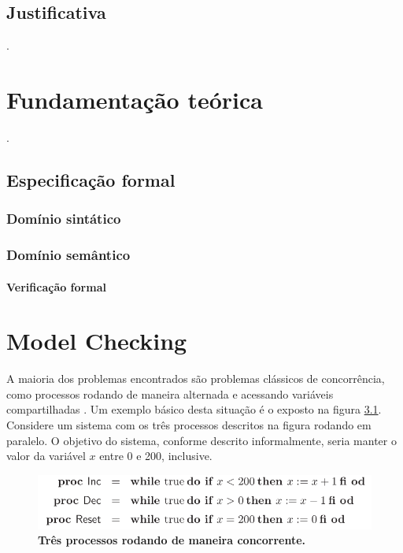 \documentclass{utfpr-pg}
\begin{document}
\section{Justificativa}
\lipsum[4-7] \cite{gummalla}.

\chapter{Fundamentação teórica}
\lipsum[2-4] \cite{wing98}.

\section{Especificação formal}
\lipsum[7-9]
\subsection{Domínio sintático}
\lipsum[10-11]
\subsection{Domínio semântico}
\lipsum[12-15]
\subsubsection{Verificação formal}
\lipsum[16-17]
\lipsum[20-27]

\chapter{Model Checking}

A maioria dos problemas encontrados são problemas clássicos de concorrência, como processos rodando de maneira alternada e acessando variáveis compartilhadas \cite{Katoen08}. Um exemplo básico desta situação é o exposto na figura \ref{fig:interleaving}. Considere um sistema com os três processos descritos na figura rodando em paralelo. O objetivo do sistema, conforme descrito informalmente, seria manter o valor da variável $\mathit{x}$ entre 0 e 200, inclusive.
\begin{figure}[h]
  \centering
  \includegraphics[scale=.5]{interleaving.png}
  \caption{\textbf{Três processos rodando de maneira concorrente.}}
  \label{fig:interleaving}
\end{figure}
\end{document}
